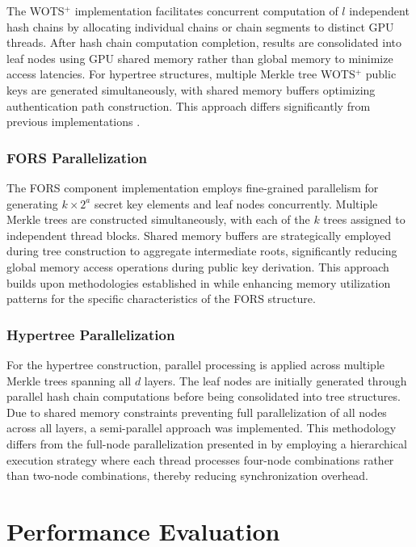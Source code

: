 \documentclass[journal]{IEEEtran}
\begin{document}
The WOTS$^+$ implementation facilitates concurrent computation of $l$ independent hash chains by allocating individual chains or chain segments to distinct GPU threads. After hash chain computation completion, results are consolidated into leaf nodes using GPU shared memory rather than global memory to minimize access latencies. For hypertree structures, multiple Merkle tree WOTS$^+$ public keys are generated simultaneously, with shared memory buffers optimizing authentication path construction. This approach differs significantly from previous implementations \cite{Kim2024}.

\subsubsection{FORS Parallelization}

The FORS component implementation employs fine-grained parallelism for generating $k \times 2^a$ secret key elements and leaf nodes concurrently. Multiple Merkle trees are constructed simultaneously, with each of the $k$ trees assigned to independent thread blocks. Shared memory buffers are strategically employed during tree construction to aggregate intermediate roots, significantly reducing global memory access operations during public key derivation. This approach builds upon methodologies established in \cite{Wang2025} while enhancing memory utilization patterns for the specific characteristics of the FORS structure.

\subsubsection{Hypertree Parallelization}

For the hypertree construction, parallel processing is applied across multiple Merkle trees spanning all $d$ layers. The leaf nodes are initially generated through parallel hash chain computations before being consolidated into tree structures. Due to shared memory constraints preventing full parallelization of all nodes across all layers, a semi-parallel approach was implemented. This methodology differs from the full-node parallelization presented in \cite{Wang2025} by employing a hierarchical execution strategy where each thread processes four-node combinations rather than two-node combinations, thereby reducing synchronization overhead.

\section{Performance Evaluation}\label{sec:evaluation}
\end{document}
